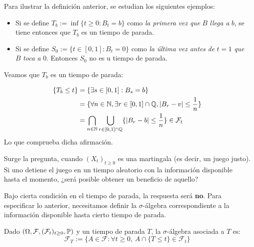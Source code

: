 \begin{example}
Para ilustrar la definición anterior, se estudian los siguientes ejemplos:
        \begin{itemize}
                        \item  Si se define $T_b := \inf \{t\geq 0 : B_t =
                                b \}$ como \textit{la primera vez que} $B$
                                \textit{llega a} $b$, se tiene entonces que $T_b$ es un tiempo de parada. 
                        \item Si se define $S_0 := \{ t \in [0,1]: B_t = 0 \}$ como 
                                \textit{la última vez antes de} $t=1$ \textit{que} $B$ \textit{toca a} $0$. 
                                Entonces $S_0$ no es u tiempo de parada. 
        \end{itemize}
        Veamos que $T_b$ es un tiempo de parada:

        \begin{align*}
                \{ T_b \leq t \} 
                &= \{\exists s \in [0,1]: B_s = b \} \\
                &= \{\forall n \in \N, \exists r \in [0,1] \cap \mathbb{Q}, \abs{B_r -v} \leq \frac{1}{n}\}\\
                &= \bigcap_{n \in \N} \bigcup_{r \in [0,1] \cap \mathbb{Q}} \{
                        \abs{B_r -b} \leq \frac{1}{n} \} \in \mathcal{F}_{t}
        \end{align*}
        Lo que comprueba dicha afirmación.
\end{example}

Surge la pregunta, cuando $(X_t)_{t \geq 0}$ es una martingala (es decir, un juego justo). Si uno detiene 
el juego en un tiempo aleatorio con la información disponible hasta el momento,
¿será posible obtener un beneficio de aquello? 

\newp Bajo cierta condición en el tiempo de parada, la respuesta será \textbf{no}. Para especificar lo anterior, 
necesitamos definir la $\sigma$-álgebra correspondiente a la información disponible hasta cierto 
tiempo de parada. 

\begin{definition}
        Dado $(\Omega, \mathcal{F}, (\mathcal{F}_t)_{t \geq 0}, \P)$ y un tiempo de parada $T$, la 
        $\sigma$-álgebra asociada a $T$ es:
        \begin{equation*}
                \mathcal{F}_T := \{ A \in \mathcal{F}: \forall t \geq 0, ~ A \cap
                \{T\leq t\} \in \mathcal{F}_t \}
        \end{equation*}
\end{definition}

